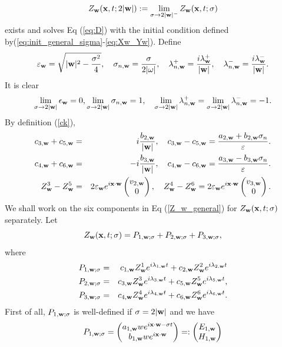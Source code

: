 \documentclass[10pt,reqno]{amsart}
\def\eps{\varepsilon}
\renewcommand{\(}{\left(}
\renewcommand{\)}{\right)}
\newcommand{\bw}{{\bf w}}
\newcommand{\bx}{\mathbf{x}}
\numberwithin{equation}{section}
\begin{document}
\begin{equation}
Z_{\bw}(\bx, t; 2|\bw|) :=  \lim_{\sigma\to 2|\bw|^-}Z_{\bw}(\bx, t; \sigma) 
\end{equation}
exists and solves Eq (\ref{eq:D}) with the initial condition defined by(\ref{eq:init_general_sigma}-\ref{eq:Xw_Yw}).
Define
\[
\eps_{\bw} = \sqrt{|\bw|^2-\frac{\sigma^2}4}, \quad \sigma_{n,\bw}=\frac{\sigma}{2|\omega|}, \quad \lambda^+_{n,\bw} = \frac{i\lambda^+_{\bw}}{|\bw|}, \quad \lambda^-_{n,\bw} = \frac{i\lambda^-_{\bw}}{|\bw|}.
\]
It is clear
\[
\lim_{\sigma\to 2|\bw|} \epsilon_{\bw} = 0, \lim_{\sigma\to 2|\bw|} \sigma_{n,\bw}= 1, \quad  \lim_{\sigma\to 2|\bw|} \lambda^+_{n,\bw} =\lim_{\sigma\to 2|\bw|} \lambda^-_{n,\bw}= -1.
\]
By definition (\ref{ck}),
\begin{eqnarray*}
	c_{3,\bw} + c_{5,\bw} &=& i\frac{b_{2,\bw}}{|\bw|}, \quad  c_{3,\bw} - c_{5,\bw} = \frac{a_{2,\bw} + b_{2,\bw}\sigma_n}{\eps}. \label{c_3_p_5}\\
	c_{4,\bw} + c_{6,\bw} &=& -i\frac{b_{3,\bw}}{|\bw|}, \quad  c_{4,\bw} - c_{6,\bw} = \frac{a_{3,\bw} - b_{3,\bw}\sigma_n}{\eps}. \label{c_4_p_6}\\
	Z^3_{\bw}-Z^5_{\bw} &=& 2\eps_{\bw}e^{i\bx\cdot\bw}\begin{pmatrix}
		v_{2,\bw} \\
		0
	\end{pmatrix}, \quad Z^4_{\bw}-Z^6_{\bw} = 2\eps_{\bw}e^{i\bx\cdot\bw}\begin{pmatrix}
		v_{3,\bw} \\
		0
	\end{pmatrix}.
\end{eqnarray*}
We shall work on the six components in Eq (\ref{Z_w_general}) for $Z_{\bw}(\bx, t; \sigma)$ separately. Let
\[
Z_{\bw}(\bx, t; \sigma) = P_{1,\bw; \sigma } + P_{2,\bw; \sigma} + P_{3,\bw; \sigma},
\]
where
\begin{eqnarray*}
P_{1,\bw; \sigma } &=& c_{1,\bw}  Z^1_{\bw} e^{i \lambda_{1,\bw} t} + c_{2,\bw}  Z^2_{\bw} e^{i \lambda_{2,\bw} t}\\
	P_{2,\bw; \sigma}&=&c_{3,\bw}  Z^3_{\bw} e^{i \lambda_{3,\bw} t} + c_{5,\bw}  Z^5_{\bw} e^{i \lambda_{5,\bw} t}, \nonumber\\ 
	P_{3,\bw; \sigma}&=&c_{4,\bw}  Z^4_{\bw} e^{i \lambda_{4,\bw} t} + c_{6,\bw}  Z^6_{\bw} e^{i \lambda_{6,\bw} t}. \nonumber
\end{eqnarray*}
 First of all, $P_{1,\bw; \sigma }$ is well-defined if $\sigma=2|\bw|$ and we have
\begin{equation}\label{prop:sol_12}
	P_{1,\bw; \sigma}= 
	\begin{pmatrix}
		a_{1,\bw}w e^{i\bx \cdot \bw -\sigma t}\\
		b_{1,\bw}w e^{i\bx \cdot \bw}
	\end{pmatrix}=:\begin{pmatrix}
		E_{1,\bw}\\
		H_{1,\bw}
	\end{pmatrix}
\end{equation} 
\end{document}
